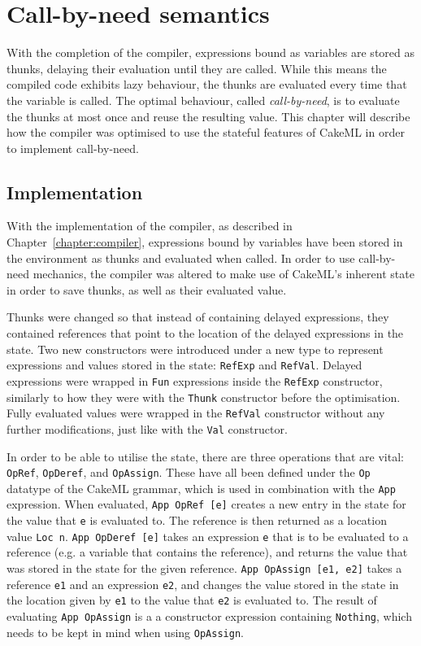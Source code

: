 \chapter{Call-by-need semantics}
With the completion of the compiler, expressions bound as variables are stored
as thunks, delaying their evaluation until they are called. While this means
the compiled code exhibits lazy behaviour, the thunks are evaluated every
time that the variable is called. The optimal behaviour, called
\textit{call-by-need}, is to evaluate the thunks at most once and reuse the
resulting value. This chapter will describe how the compiler was optimised to
use the stateful features of CakeML in order to implement call-by-need.

\section{Implementation}
\label{cbn:impl}
With the implementation of the compiler, as described in
Chapter~\ref{chapter:compiler}, expressions bound by variables have been stored
in the environment as thunks and evaluated when called. In order to use
call-by-need mechanics, the compiler was altered to make use of CakeML's
inherent state in order to save thunks, as well as their evaluated value.

Thunks were changed so that instead of containing delayed expressions, they
contained references that point to the location of the delayed expressions in
the state. Two new constructors were introduced under a new type to represent
expressions and values stored in the state: \texttt{RefExp} and \texttt{RefVal}.
Delayed expressions were wrapped in \texttt{Fun} expressions inside the
\texttt{RefExp} constructor, similarly to how they were with the \texttt{Thunk}
constructor before the optimisation. Fully evaluated values were wrapped in the
\texttt{RefVal} constructor without any further modifications, just like with
the \texttt{Val} constructor.

In order to be able to utilise the state, there are three operations that are
vital: \texttt{OpRef}, \texttt{OpDeref}, and \texttt{OpAssign}. These have all
been defined under the \texttt{Op} datatype of the CakeML grammar, which is used
in combination with
the \texttt{App} expression. When evaluated, \texttt{App OpRef [e]} creates a new
entry in the state for the value that \texttt{e} is evaluated to. The reference
is then returned as a location value \texttt{Loc n}. \texttt{App OpDeref [e]}
takes an expression \texttt{e} that is to be evaluated to a reference (e.g. a
variable that contains the reference), and returns the value that was stored in
the state for the given reference. \texttt{App OpAssign [e1, e2]} takes a
reference \texttt{e1} and an expression \texttt{e2}, and changes the value
stored in the state in the location given by \texttt{e1} to the value that
\texttt{e2} is evaluated to. The result of evaluating \texttt{App OpAssign}
is a a constructor expression containing \texttt{Nothing}, which needs to be
kept in mind when using \texttt{OpAssign}.

